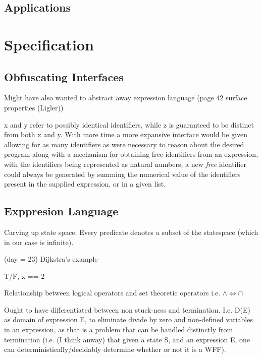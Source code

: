 \documentclass[oneside,12pt]{article}
\begin{document}
\subsection{Applications}

\section{Specification}



\subsection{Obfuscating Interfaces}

Might have also wanted to abstract away expression language
(page 42 surface properties (Ligler))


x and y refer to possibly identical identifiers, while z is guaranteed to be distinct from both x and y. With more time a more expansive interface would be given allowing for as many identifiers as were necessary to reason about the desired program along with a mechanism for obtaining free identifiers from an expression, with the identifiers being represented as natural numbers, a new \emph{free} identifier could always be generated by summing the numerical value of the identifiers present in the supplied expression, or in a given list.

\subsection{Exppresion Language}

Carving up state space.
Every predicate denotes a subset of the statespace
(which in our case is infinite).

(day = 23) Dijkstra's example

T/F, x == 2

Relationship between logical operators and set theoretic operators
i.e. $\wedge \Leftrightarrow \cap$

{\advance\leftskip\mathindent



}

Ought to have differentiated between non stuck-ness and termination. I.e. D(E) as domain of expression E, to eliminate divide by zero and non-defined variables in an expression, as that is a problem that can be handled distinctly from termination
(i.e. (I think anway) that given a state S, and an expression E, one can deterministically/decidably determine whether or not it is a WFF).
\end{document}
